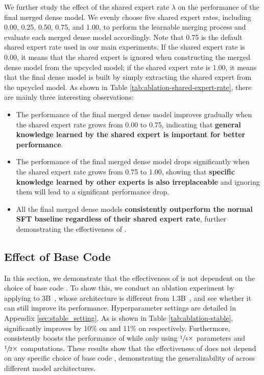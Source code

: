 

We further study the effect of the shared expert rate $\lambda$ on the performance of the final merged dense model. We evenly choose five shared expert rates, including 0.00, 0.25, 0.50, 0.75, and 1.00, to perform the learnable merging process and evaluate each merged dense model accordingly. Note that 0.75 is the default shared expert rate used in our main experiments. If the shared expert rate is 0.00, it means that the shared expert is ignored when constructing the merged dense model from the upcycled \moe model; if the shared expert rate is 1.00, it means that the final dense model is built by simply extracting the shared expert from the upcycled \moe model. As shown in Table \ref{tab:ablation-shared-expert-rate}, there are mainly three interesting observations:
\begin{itemize}[leftmargin=1em]
    \setlength{\parskip}{2pt}
    \setlength\itemsep{0pt}
    \item The performance of the final merged dense model improves gradually when the shared expert rate grows from 0.00 to 0.75, indicating that \textbf{general knowledge learned by the shared expert is important for better performance}.
    \item The performance of the final merged dense model drops significantly when the shared expert rate grows from 0.75 to 1.00, showing that \textbf{specific knowledge learned by other experts is also irreplaceable} and ignoring them will lead to a significant performance drop.
    \item All the final merged dense models \textbf{consistently outperform the normal SFT baseline regardless of their shared expert rate}, further demonstrating the effectiveness of \ours.
\end{itemize}

\subsection{Effect of Base Code \llm}
In this section, we demonstrate that the effectiveness of \ours is not dependent on the choice of base code . To show this, we conduct an ablation experiment by applying \ours to \stablecoder 3B~\cite{stable-code-3b}, whose architecture is different from \dscoderbase 1.3B~\cite{guo2024deepseekcoder}, and see whether it can still improve its performance. Hyperparameter settings are detailed in Appendix \ref{sec:stable_setting}. As is shown in Table \ref{tab:ablation-stable}, \stablemerge significantly improves \baselinestable by 10\% on \humaneval and 11\% on \humanevalp respectively. Furthermore, \stablemerge consistently boosts the performance of \stablemoe while only using $\sfrac{1}{4}\times$ parameters and $\sfrac{1}{2}\times$ computations. These results show that the effectiveness of \ours does not depend on any specific choice of base code , demonstrating the generalizability of \ours across different model architectures.


